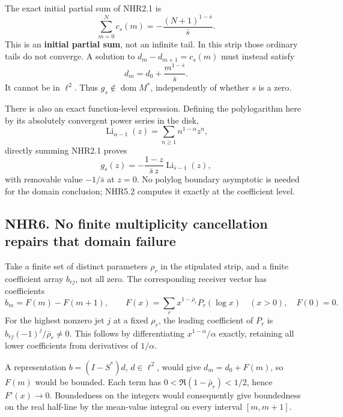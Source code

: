 The exact initial partial sum of NHR2.1 is \[
 \boxed{\sum_{m=0}^{N}c_s(m)=-\frac{(N+1)^{1-\bar s}}{\bar s}.}
 \tag{NHR5.2}
\] This is an \textbf{initial partial sum}, not an infinite tail. In
this strip those ordinary tails do not converge. A solution to
\(d_m-d_{m+1}=c_s(m)\) must instead satisfy \[
 d_m=d_0+\frac{m^{1-\bar s}}{\bar s}.
\] It cannot be in \(\ell^2\). Thus \(g_s\notin\operatorname{dom}M^*\),
independently of whether \(s\) is a zero.

There is also an exact function-level expression. Defining the
polylogarithm here by its absolutely convergent power series in the
disk, \[
 \operatorname{Li}_{\alpha-1}(z)=\sum_{n\ge1}n^{1-\alpha}z^n,
\] directly summing NHR2.1 proves \[
 g_s(z)=-\frac{1-z}{\bar s\,z}\operatorname{Li}_{\bar s-1}(z),
 \tag{NHR5.3}
\] with removable value \(-1/\bar s\) at \(z=0\). No polylog boundary
asymptotic is needed for the domain conclusion; NHR5.2 computes it
exactly at the coefficient level.

\subsection{NHR6. No finite multiplicity cancellation repairs that
domain
failure}\label{nhr6.-no-finite-multiplicity-cancellation-repairs-that-domain-failure}

Take a finite set of distinct parameters \(\rho_r\) in the stipulated
strip, and a finite coefficient array \(b_{rj}\), not all zero. The
corresponding receiver vector has coefficients \[
 b_m=F(m)-F(m+1),\qquad
 F(x)=\sum_r x^{1-\bar\rho_r}P_r(\log x)\quad(x>0),\quad F(0)=0.
 \tag{NHR6.1}
\] For the highest nonzero jet \(j\) at a fixed \(\rho_r\), the leading
coefficient of \(P_r\) is \(b_{rj}(-1)^j/\bar\rho_r\ne0\). This follows
by differentiating \(x^{1-\alpha}/\alpha\) exactly, retaining all lower
coefficients from derivatives of \(1/\alpha\).

A representation \(b=(I-S^*)d\), \(d\in\ell^2\), would give
\(d_m=d_0+F(m)\), so \(F(m)\) would be bounded. Each term has
\(0<\Re(1-\bar\rho_r)<1/2\), hence \(F'(x)\to0\). Boundedness on the
integers would consequently give boundedness on the real half-line by
the mean-value integral on every interval \([m,m+1]\).

